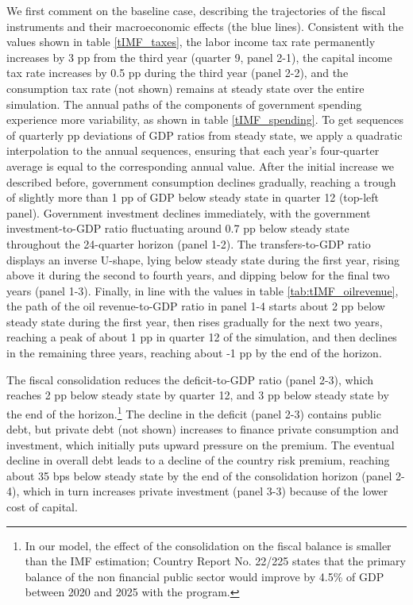 \documentclass[12pt]{article}
\begin{document}
We first comment on the baseline case, describing the trajectories of the fiscal instruments and their macroeconomic effects (the blue lines). Consistent with the values shown in table \ref{tIMF_taxes}, the labor income tax rate permanently increases by 3 pp from the third year (quarter 9, panel 2-1), the capital income tax rate increases by 0.5 pp during the third year (panel 2-2), and the consumption tax rate (not shown) remains at steady state over the entire simulation. The annual paths of the components of government spending experience more variability, as shown in table \ref{tIMF_spending}. To get sequences of quarterly pp deviations of GDP ratios from steady state, we apply a quadratic interpolation to the annual sequences, ensuring that each year's four-quarter average is equal to the corresponding annual value. After the initial increase we described before, government consumption declines gradually, reaching a trough of slightly more than 1 pp of GDP below steady state in quarter 12 (top-left panel). Government investment declines immediately, with the government investment-to-GDP ratio fluctuating around 0.7 pp below steady state throughout the 24-quarter horizon (panel 1-2). The transfers-to-GDP ratio displays an inverse U-shape, lying below steady state during the first year, rising above it during the second to fourth years, and dipping below for the final two years (panel 1-3). Finally, in line with the values in table \ref{tab:tIMF_oilrevenue}, the path of the oil revenue-to-GDP ratio in panel 1-4 starts about 2 pp below steady state during the first year, then rises gradually for the next two years, reaching a peak of about 1 pp in quarter 12 of the simulation, and then declines in the remaining three years, reaching about -1 pp by the end of the horizon.

The fiscal consolidation reduces the deficit-to-GDP ratio (panel 2-3), which reaches 2 pp below steady state by quarter 12, and 3 pp below steady state by the end of the horizon.\footnote{In our model, the effect of the consolidation on the fiscal balance is smaller than the IMF estimation; Country Report No. 22/225 states that the primary balance of the non financial public sector would improve by 4.5\% of GDP between 2020 and 2025 with the program.} The decline in the deficit (panel 2-3) contains public debt, but private debt (not shown) increases to finance private consumption and investment, which initially puts upward pressure on the premium. The eventual decline in overall debt leads to a decline of the country risk premium, reaching about 35 bps below steady state by the end of the consolidation horizon (panel 2-4), which in turn increases private investment (panel 3-3) because of the lower cost of capital.
\end{document}
